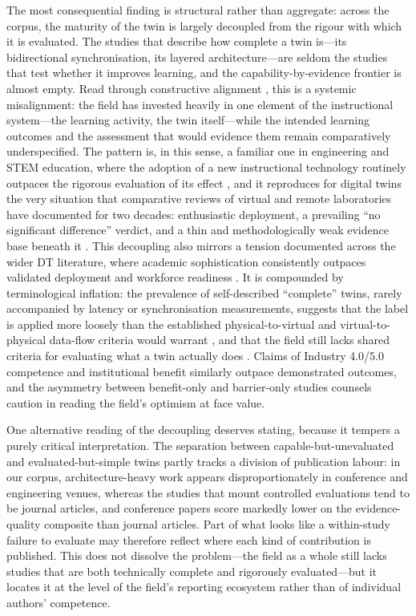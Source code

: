 The most consequential finding is structural rather than aggregate: across the
corpus, the maturity of the twin is largely decoupled from the rigour with which
it is evaluated. The studies that describe how complete a twin is---its
bidirectional synchronisation, its layered architecture---are seldom the studies
that test whether it improves learning, and the capability-by-evidence frontier
is almost empty. Read through constructive alignment \cite{biggs_enhancing_1996,biggs_teaching_2011}, this is a systemic misalignment: the field has invested
heavily in one element of the instructional system---the learning activity, the
twin itself---while the intended learning outcomes and the assessment that would
evidence them remain comparatively underspecified. The pattern is, in this sense,
a familiar one in engineering and STEM education, where the adoption of a new
instructional technology routinely outpaces the rigorous evaluation of its effect
\cite{henderson_facilitating_2011}, and it reproduces for digital twins the very
situation that comparative reviews of virtual and remote laboratories have
documented for two decades: enthusiastic deployment, a prevailing ``no significant
difference'' verdict, and a thin and methodologically weak evidence base beneath it
\cite{brinson_learning_2015,heradio_virtual_2016}. This decoupling also mirrors a
tension documented across the wider DT
literature, where academic sophistication consistently outpaces validated
deployment and workforce readiness \cite{chen_ai-enhanced_2025}. It is compounded by
terminological inflation: the prevalence of self-described ``complete'' twins,
rarely accompanied by latency or synchronisation measurements, suggests that the
label is applied more loosely than the established physical-to-virtual and
virtual-to-physical data-flow criteria would warrant \cite{thelen_comprehensive_2022}, and
that the field still lacks shared criteria for evaluating what a twin actually
does \cite{liu_cognitive_2025}. Claims of Industry 4.0/5.0 competence and institutional
benefit similarly outpace demonstrated outcomes, and the asymmetry between
benefit-only and barrier-only studies counsels caution in reading the field's
optimism at face value.

One alternative reading of the decoupling deserves stating, because it tempers a
purely critical interpretation. The separation between capable-but-unevaluated and
evaluated-but-simple twins partly tracks a division of publication labour: in our
corpus, architecture-heavy work appears disproportionately in conference and
engineering venues, whereas the studies that mount controlled evaluations tend to
be journal articles, and conference papers score markedly lower on the
evidence-quality composite than journal articles. Part of what looks like a
within-study failure to evaluate may therefore reflect where each kind of
contribution is published. This does not dissolve the problem---the field as a whole
still lacks studies that are both technically complete and rigorously
evaluated---but it locates it at the level of the field's reporting ecosystem rather
than of individual authors' competence.

